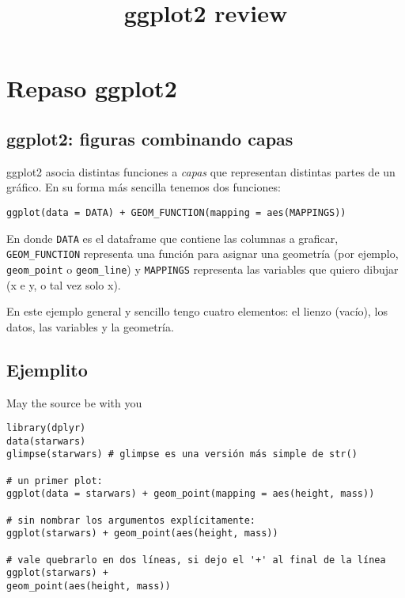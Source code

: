 \documentclass[]{article}
\title{ggplot2 review}
\date{}
\begin{document}
\maketitle

\hypertarget{repaso-ggplot2}{%
\section{Repaso ggplot2}\label{repaso-ggplot2}}

\hypertarget{ggplot2-figuras-combinando-capas}{%
\subsection{ggplot2: figuras combinando
capas}\label{ggplot2-figuras-combinando-capas}}

ggplot2 asocia distintas funciones a \emph{capas} que representan
distintas partes de un gráfico. En su forma más sencilla tenemos dos
funciones:

\begin{verbatim}
ggplot(data = DATA) + GEOM_FUNCTION(mapping = aes(MAPPINGS))
\end{verbatim}

En donde \texttt{DATA} es el dataframe que contiene las columnas a
graficar, \texttt{GEOM\_FUNCTION} representa una función para asignar
una geometría (por ejemplo, \texttt{geom\_point} o \texttt{geom\_line})
y \texttt{MAPPINGS} representa las variables que quiero dibujar (x e y,
o tal vez solo x).

En este ejemplo general y sencillo tengo cuatro elementos: el lienzo
(vacío), los datos, las variables y la geometría.

\hypertarget{ejemplito}{%
\subsection{Ejemplito}\label{ejemplito}}

May the source be with you

\begin{verbatim}
library(dplyr)
data(starwars)
glimpse(starwars) # glimpse es una versión más simple de str()

# un primer plot:
ggplot(data = starwars) + geom_point(mapping = aes(height, mass))

# sin nombrar los argumentos explícitamente:
ggplot(starwars) + geom_point(aes(height, mass))

# vale quebrarlo en dos líneas, si dejo el '+' al final de la línea
ggplot(starwars) + 
geom_point(aes(height, mass))
\end{verbatim}
\end{document}
